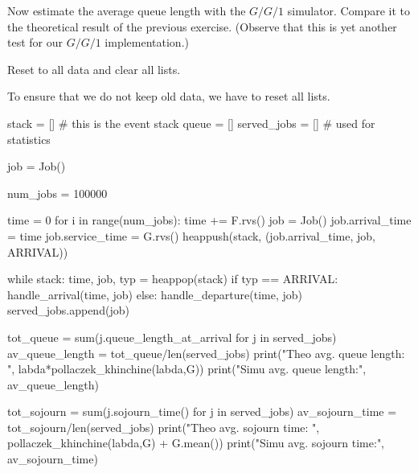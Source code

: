 \begin{exercise}
  Now estimate the average queue length with the $G/G/1$ simulator.
  Compare it to the theoretical result of the previous exercise.
  (Observe that this is yet another test for our $G/G/1$ implementation.)


  \begin{hint}
Reset to all data and clear all lists. 
  \end{hint}

  \begin{solution}
To ensure that we do not keep old data, we have to reset all lists. 

\begin{pyverbatim}
stack = [] # this is the event stack
queue = []
served_jobs = [] # used for statistics

job = Job()

num_jobs = 100000

time = 0
for i in range(num_jobs):
    time += F.rvs()
    job = Job()
    job.arrival_time = time
    job.service_time = G.rvs()
    heappush(stack, (job.arrival_time, job, ARRIVAL))

while stack:
    time, job, typ = heappop(stack)
    if typ == ARRIVAL:
        handle_arrival(time, job)
    else:
        handle_departure(time, job)
        served_jobs.append(job)

tot_queue = sum(j.queue_length_at_arrival for j in served_jobs)
av_queue_length = tot_queue/len(served_jobs)
print("Theo avg. queue length: ", labda*pollaczek_khinchine(labda,G))
print("Simu avg. queue length:", av_queue_length)
      
tot_sojourn = sum(j.sojourn_time() for j in served_jobs)
av_sojourn_time = tot_sojourn/len(served_jobs)
print("Theo avg. sojourn time: ", pollaczek_khinchine(labda,G) + G.mean())
print("Simu avg. sojourn time:", av_sojourn_time)
  
\end{pyverbatim}

  \end{solution}

\end{exercise}

